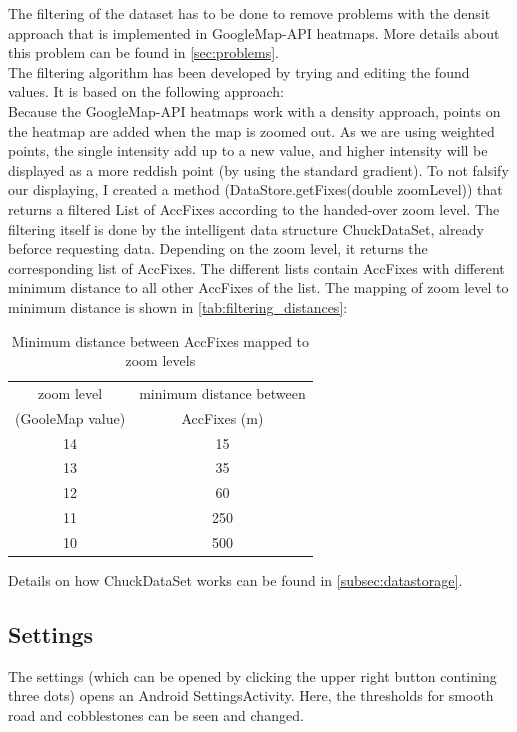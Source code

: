 \documentclass[10pt,a4paper]{article} %
\begin{document}
	The filtering of the dataset has to be done to remove problems with the densit approach that is implemented in GoogleMap-API heatmaps.
	More details about this problem can be found in \autoref{sec:problems}.\\
	The filtering algorithm has been developed by trying and editing the found values.
	It is based on the following approach:\\
	Because the GoogleMap-API heatmaps work with a density approach, points on the heatmap are added when the map is zoomed out.
	As we are using weighted points, the single intensity add up to a new value, and higher intensity will be displayed as a more reddish point (by using the standard gradient).
	To not falsify our displaying, I created a method (DataStore.getFixes(double zoomLevel)) that returns a filtered List of AccFixes according to the handed-over zoom level.
	The filtering itself is done by the intelligent data structure ChuckDataSet, already beforce requesting data.
	Depending on the zoom level, it returns the corresponding list of AccFixes.
	The different lists contain AccFixes with different minimum distance to all other AccFixes of the list.
	The mapping of zoom level to minimum distance is shown in \autoref{tab:filtering_distances}:

	\begin{table}[h!]
	  \centering
 
  
	  \begin{tabular}{c|c}
	    zoom level & minimum distance between\\
		(GooleMap value) 	& AccFixes (m)\\
	    \hline
	    	14 & 15\\
		13 & 35\\
		12 & 60\\
		11 & 250\\
		10 & 500\\
	  \end{tabular}
	   \caption{Minimum distance between AccFixes mapped to zoom levels} 
	   \label{tab:filtering_distances}
	\end{table}

	Details on how ChuckDataSet works can be found in \autoref{subsec:datastorage}. %

		
	\subsection{Settings}

	The settings (which can be opened by clicking the upper right button contining three dots) opens an Android SettingsActivity.
	Here, the thresholds for smooth road and cobblestones can be seen and changed.
\end{document}
